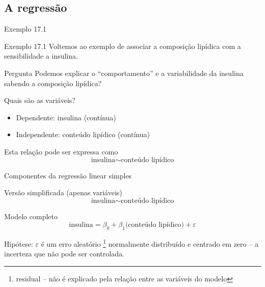 \documentclass{beamer}
\begin{document}
\subsection{A regressão}

\begin{frame}{Exemplo 17.1}
  \begin{exampleblock}{Exemplo 17.1}
    Voltemos ao exemplo de associar a composição lipídica com a sensibilidade a insulina.    
  \end{exampleblock}
  \begin{block}{Pergunta}
    Podemos explicar o ``comportamento'' e a variabilidade da insulina sabendo a composição lipídica?
  \end{block}
\end{frame}

\begin{frame}{Quais são as variáveis?}
  \begin{itemize}
  \item Dependente: insulina (contínua)
  \item Independente: conteúdo lipídico (contínua)
  \end{itemize}
  \vfill
  \begin{block}{Esta relação pode ser expressa como}
    \begin{displaymath}
      \text{insulina} \sim \text{conteúdo lipídico}
    \end{displaymath}
  \end{block}
\end{frame}

\begin{frame}{\small Componentes da regressão linear simples}
  \begin{block}{\footnotesize Versão simplificada (apenas variáveis)}
    \footnotesize
    \begin{displaymath}
      \text{insulina} \sim \text{conteúdo lipídico}
    \end{displaymath}
  \end{block}
  \bigskip
  \bigskip
  \begin{block}{Modelo completo}
    \begin{displaymath}
      \text{insulina} =\beta_0 + \beta_1 \text{(conteúdo lipídico)} + \varepsilon
    \end{displaymath}
  \end{block}
  \vfill
  \footnotesize
  Hipótese: $\varepsilon$ é um erro aleatório \footnote{\scriptsize residual -- não é explicado pela relação entre as variáveis do modelo} normalmente distribuído e centrado em zero -- a incerteza que não pode ser controlada.
\end{frame}
\end{document}
